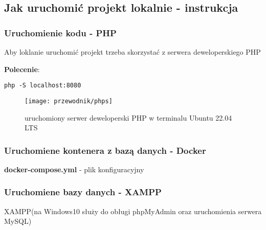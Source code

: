         \subsection{Jak uruchomić projekt lokalnie - instrukcja}


        \subsubsection{Uruchomienie kodu - PHP}
        Aby loklanie uruchomić projekt trzeba skorzystać z serwera deweloperskiego PHP

        \textbf{Polecenie}:
        \begin{lstlisting}
php -S localhost:8080
        \end{lstlisting}
        \newpage

        \begin{figure}[!htb]
            \centering
            \texttt{[image: przewodnik/phps]}
            \caption{uruchomiony serwer deweloperski PHP w terminalu Ubuntu 22.04 LTS }                
        \end{figure}

        \subsubsection{Uruchomiene kontenera z bazą danych -  Docker}
        \textbf{docker-compose.yml} - plik konfiguracyjny
        \subsubsection{Uruchomiene bazy danych -  XAMPP}
        XAMPP(na Windows10 służy do obługi phpMyAdmin oraz uruchomienia serwera MySQL)\\


